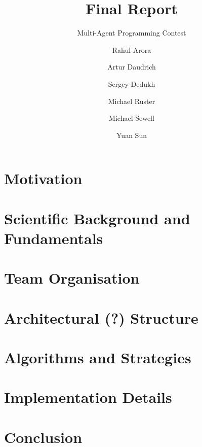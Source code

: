 \documentclass{../tech_reports/template/llncs}
\title{Final Report}
\subtitle{Multi-Agent Programming Contest}
\author{Rahul Arora \and Artur Daudrich \and Sergey Dedukh \and Michael Ruster \and Michael Sewell \and Yuan Sun}
\institute{University Koblenz-Landau}
\begin{document}
\maketitle

\section{Motivation}


\section{Scientific Background and Fundamentals}


\section{Team Organisation}


\section{Architectural (?) Structure}


\section{Algorithms and Strategies}


\section{Implementation Details}


\section{Conclusion}



\clearpage

\end{document}
